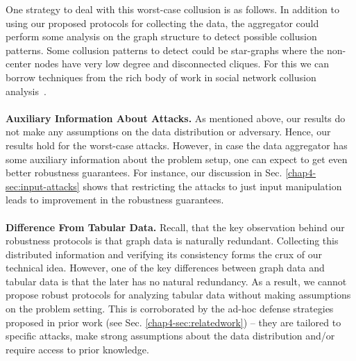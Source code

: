 One strategy to deal with this worst-case collusion is as follows. In addition to using our proposed protocols for collecting the data, the aggregator could perform some analysis on the graph structure to detect possible collusion patterns. Some collusion patterns to detect could be star-graphs where the non-center nodes have very low degree and disconnected cliques. For this we can borrow techniques from the rich body of work in social network collusion analysis~\cite{zhang2004making, shenEnhancing2016, arora2020analyzing, dutta2022blackmarket}.   \\\\
\noindent\textbf{Auxiliary Information About Attacks.} As mentioned above, our results do not make any assumptions on the data distribution or adversary. Hence, our results hold for the worst-case attacks. However, in case the data aggregator has some auxiliary information about the problem setup, one can expect to get even better robustness guarantees. For instance, our discussion in Sec. \ref{chap4-sec:input-attacks} shows that  restricting the attacks to just input manipulation leads to improvement in the robustness guarantees.     \\\\%
  \noindent\textbf{Difference From Tabular Data.} Recall, that the key observation behind our robustness protocols is that graph data is naturally redundant. Collecting this distributed information and verifying its consistency forms the crux of our technical idea. However, one of the key differences between graph data and tabular data is that the later has no natural redundancy. As a result, we cannot propose robust protocols for analyzing tabular data without making assumptions on the problem setting. This is corroborated by the ad-hoc defense strategies proposed in prior work (see Sec. \ref{chap4-sec:relatedwork}) -- they are tailored to specific attacks, make strong assumptions about the data distribution and/or require access to prior knowledge. 


\begin{comment}
\begin{enumerate}
    \item Tabular data; difference with tabular data defense strategies
    \item Attack info can give better guarantees
    \item Adversary collusion - no assumption about data distribution, also that $m$ is unavoidable.
\end{enumerate}
\end{comment}


